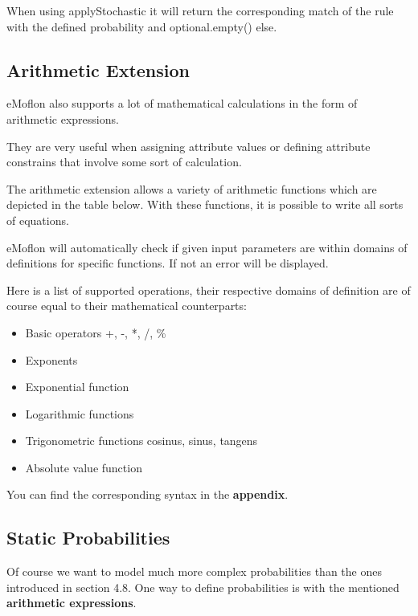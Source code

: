 When using \textsf{applyStochastic} it will return the corresponding match of the rule with the defined probability and \textsf{optional.empty()} else.

\subsection{Arithmetic Extension}

eMoflon also supports a lot of mathematical calculations in the form of arithmetic expressions.

They are very useful when assigning attribute values or defining attribute constrains that involve some sort of calculation.\newline

The arithmetic extension allows a variety of arithmetic functions which are depicted in the table below. With these functions, it is possible to write all sorts of equations.

eMoflon will automatically check if given input parameters are within domains of definitions for specific functions. If not an error will be displayed.\newline

Here is a list of supported operations, their respective domains of definition are of course equal to their mathematical counterparts:

\begin{itemize}
    \item Basic operators +, -, *, /, \%
    
    \item Exponents
    
    \item Exponential function
    \item Logarithmic functions
    \item Trigonometric functions cosinus, sinus, tangens
    \item Absolute value function
\end{itemize}

You can find the corresponding syntax in the \textbf{appendix}.\newline

\subsection{Static Probabilities}

Of course we want to model much more complex probabilities than the ones introduced in section 4.8.
One way to define probabilities is with the mentioned \textbf{arithmetic expressions}.

